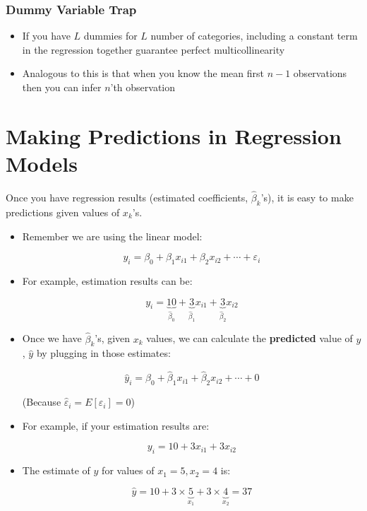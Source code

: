 \documentclass[10pt,article]{article}
\begin{document}
\subsubsection{Dummy Variable Trap}
\label{sec:org83f29ee}
\begin{itemize}
\item If you have \(L\) dummies for \(L\) number of categories, including
a constant term in the regression together guarantee perfect
multicollinearity

\item Analogous to this is that when you know the mean first \(n-1\) observations then
you can infer \(n\)'th observation
\end{itemize}
\section{Making Predictions in Regression Models}
\label{sec:orgb59b576}
Once you have regression results (estimated coefficients,
\(\widehat\beta_k\)'s), it is easy to make predictions given values of
\(x_k\)'s.

\begin{itemize}
\item Remember we are using the linear model:

\[ y_i = \beta_0 + \beta_1 x_{i1} + \beta_2 x_{i2} + \cdots + \varepsilon_i \]

\item For example, estimation results can be:

\[ y_i = \underbrace{10}_{\widehat\beta_0} +
           \underbrace{3}_{\widehat\beta_1} x_{i1} + \underbrace{3}_{\widehat\beta_2} 
  x_{i2} \]
\end{itemize}

\begin{itemize}
\item Once we have \(\widehat\beta_k\)'s, given \(x_k\) values, we can
calculate the \textbf{predicted} value of \(y\), \(\widehat y\) by plugging in
those estimates:

\[ \widehat{y}_i = \widehat\beta_0 + \widehat\beta_1 x_{i1} + \widehat\beta_2
     x_{i2} + \cdots + 0 \]

(Because \(\hat{\varepsilon}_i=E[\varepsilon_i]=0\))
\end{itemize}

\begin{itemize}
\item For example, if your estimation results are:

\[ y_i = 10 + 3 x_{i1} + 3 x_{i2} \]
\end{itemize}

\begin{itemize}
\item The estimate of \(y\) for values of \(x_{1} = 5, x_{2} = 4\) is:

\[ \widehat{y} = 10 + 3 \times \underbrace{5}_{x_{1}} + 3 \times \underbrace{4}_{x_{2}} = 37 \]
\end{itemize}
\end{document}
